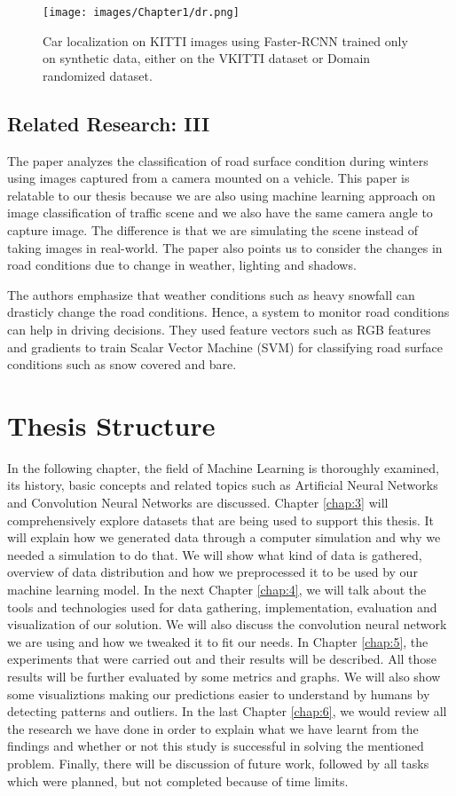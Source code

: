 \begin{figure}[H]
  \centering
  \texttt{[image: images/Chapter1/dr.png]}
  \caption{Car localization on KITTI images using Faster-RCNN trained only on synthetic data, either on the VKITTI dataset or Domain randomized dataset.}
  \label{fig:dr}
\end{figure}

\subsection{Related Research: III}
The paper \cite{omer2010automatic} analyzes the classification of road surface condition during winters using images captured from a camera mounted on a vehicle. This paper is relatable to our thesis because we are also using machine learning approach on image classification of traffic scene and we also have the same camera angle to capture image. The difference is that we are simulating the scene instead of taking images in real-world. The paper also points us to consider the changes in road conditions due to change in weather, lighting and shadows.
\par
The authors emphasize that weather conditions such as heavy snowfall can drasticly change the road conditions. Hence, a system to monitor road conditions can help in driving decisions. They used feature vectors such as RGB features and gradients to train Scalar Vector Machine (SVM) for classifying road surface conditions such as snow covered and bare.

\section{Thesis Structure}
In the following chapter, the field of Machine Learning is thoroughly examined, its history, basic concepts and related topics such as Artificial Neural Networks \cite{ann} and Convolution Neural Networks are discussed. Chapter \ref{chap:3} will comprehensively explore datasets that are being used to support this thesis. It will explain how we generated data through a computer simulation and why we needed a simulation to do that. We will show what kind of data is gathered, overview of data distribution and how we preprocessed it to be used by our machine learning model. In the next Chapter \ref{chap:4}, we will talk about the tools and technologies used for data gathering, implementation, evaluation and visualization of our solution. We will also discuss the convolution neural network we are using and how we tweaked it to fit our needs. In Chapter \ref{chap:5}, the experiments that were carried out and their results will be described. All those results will be further evaluated by some metrics and graphs. We will also show some visualiztions making our predictions easier to understand by humans by detecting patterns and outliers. In the last Chapter \ref{chap:6}, we would review all the research we have done in order to explain what we have learnt from the findings and whether or not this study is successful in solving the mentioned problem. Finally, there will be discussion of future work, followed by all tasks which were planned, but not completed because of time limits.